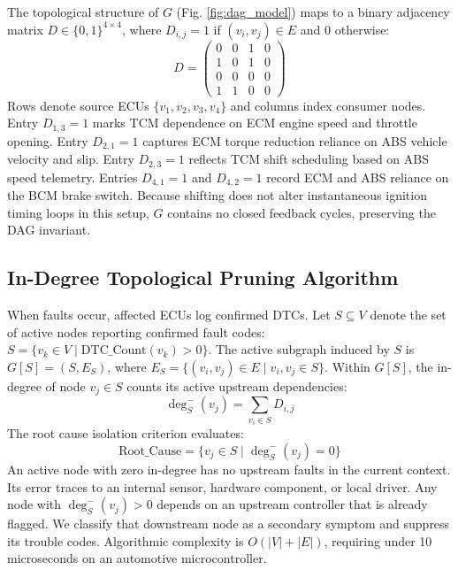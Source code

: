 \documentclass[conference]{IEEEtran}
\begin{document}
The topological structure of $G$ (Fig. \ref{fig:dag_model}) maps to a binary adjacency matrix $D \in \{0, 1\}^{4 \times 4}$, where $D_{i,j}=1$ if $(v_i, v_j) \in E$ and $0$ otherwise:
\begin{equation}
D = \begin{pmatrix}
0 & 0 & 1 & 0 \\
1 & 0 & 1 & 0 \\
0 & 0 & 0 & 0 \\
1 & 1 & 0 & 0
\end{pmatrix}
\end{equation}
Rows denote source ECUs $\{v_1, v_2, v_3, v_4\}$ and columns index consumer nodes. Entry $D_{1,3} = 1$ marks TCM dependence on ECM engine speed and throttle opening. Entry $D_{2,1} = 1$ captures ECM torque reduction reliance on ABS vehicle velocity and slip. Entry $D_{2,3} = 1$ reflects TCM shift scheduling based on ABS speed telemetry. Entries $D_{4,1} = 1$ and $D_{4,2} = 1$ record ECM and ABS reliance on the BCM brake switch. Because shifting does not alter instantaneous ignition timing loops in this setup, $G$ contains no closed feedback cycles, preserving the DAG invariant.

\subsection{In-Degree Topological Pruning Algorithm}
When faults occur, affected ECUs log confirmed DTCs. Let $S \subseteq V$ denote the set of active nodes reporting confirmed fault codes: $S = \{v_k \in V \mid \text{DTC\_Count}(v_k) > 0\}$. The active subgraph induced by $S$ is $G[S] = (S, E_S)$, where $E_S = \{(v_i, v_j) \in E \mid v_i, v_j \in S\}$. Within $G[S]$, the in-degree of node $v_j \in S$ counts its active upstream dependencies:
\begin{equation}
\deg_{S}^{-}(v_j) = \sum_{v_i \in S} D_{i,j}
\end{equation}
The root cause isolation criterion evaluates:
\begin{equation}
\text{Root\_Cause} = \{v_j \in S \mid \deg_{S}^{-}(v_j) = 0\}
\end{equation}
An active node with zero in-degree has no upstream faults in the current context. Its error traces to an internal sensor, hardware component, or local driver. Any node with $\deg_{S}^{-}(v_j) > 0$ depends on an upstream controller that is already flagged. We classify that downstream node as a secondary symptom and suppress its trouble codes. Algorithmic complexity is $O(|V| + |E|)$, requiring under 10 microseconds on an automotive microcontroller.
\end{document}
